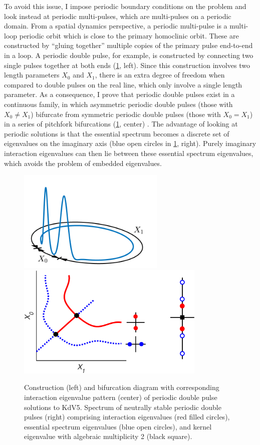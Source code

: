 \documentclass[12pt,reqno,oneside,hidelinks]{article}
\begin{document}
To avoid this issue, I impose periodic boundary conditions on the problem and look instead at periodic multi-pulses, which are multi-pulses on a periodic domain. From a spatial dynamics perspective, a periodic multi-pulse is a multi-loop periodic orbit which is close to the primary homoclinic orbit. These are constructed by ``gluing together'' multiple copies of the primary pulse end-to-end in a loop. A periodic double pulse, for example, is constructed by connecting two single pulses together at both ends (\cref{fig:periodic}, left). Since this construction involves two length parameters $X_0$ and $X_1$, there is an extra degree of freedom when compared to double pulses on the real line, which only involve a single length parameter. As a consequence, I prove that periodic double pulses exist in a continuous family, in which asymmetric periodic double pulses (those with $X_0 \neq X_1$) bifurcate from symmetric periodic double pulses (those with $X_0 = X_1$) in a series of pitchfork bifurcations (\cref{fig:periodic}, center) \cite{ParkerKdV}. The advantage of looking at periodic solutions is that the essential spectrum becomes a discrete set of eigenvalues on the imaginary axis (blue open circles in \cref{fig:periodic}, right). Purely imaginary interaction eigenvalues can then lie between these essential spectrum eigenvalues, which avoids the problem of embedded eigenvalues. 

\begin{figure}
    \begin{center}
    \includegraphics[width=7cm]{images/2pulse3d.png} \hspace{-1cm}
    \includegraphics[width=9cm]{images/2pitchforkcoloreig2.eps}
    \end{center}
    \caption{Construction (left) and bifurcation diagram with corresponding interaction eigenvalue pattern (center) of periodic double pulse solutions to KdV5. Spectrum of neutrally stable periodic double pulses (right) comprising interaction eigenvalues (red filled circles), essential spectrum eigenvalues (blue open circles), and kernel eigenvalue with algebraic multiplicity 2 (black square).}
    \label{fig:periodic}
\end{figure}
    
\end{document}
